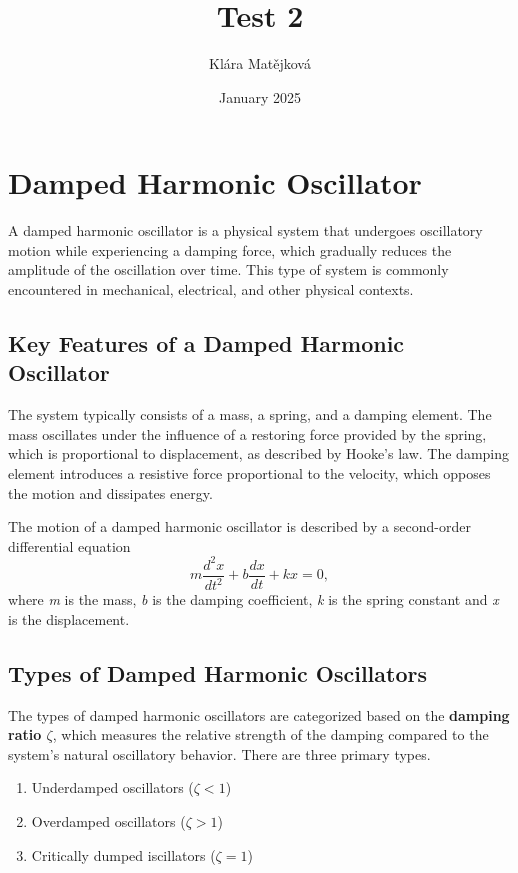 \documentclass{article}
\title{Test 2}
\author{Klára Matějková}
\date{January 2025}
\begin{document}
\maketitle

\section{Damped Harmonic Oscillator}
A damped harmonic oscillator is a physical system that undergoes oscillatory motion while experiencing a damping force, which gradually reduces the amplitude of the oscillation over time. This type of system is commonly encountered in mechanical, electrical, and other physical contexts.

\subsection{Key Features of a Damped Harmonic Oscillator}
The system typically consists of a mass, a spring, and a damping element. The mass oscillates under the influence of a restoring force provided by the spring, which is proportional to displacement, as described by Hooke's law. The damping element introduces a resistive force proportional to the velocity, which opposes the motion and dissipates energy.

The motion of a damped harmonic oscillator is described by a second-order differential equation
\begin{equation}
    m\frac{d^2x}{dt^2}+b\frac{dx}{dt}+kx=0,
\end{equation}
where \emph{m} is the mass, \emph{b} is the damping coefficient, \emph{k} is the spring constant and \emph{x} is the displacement.

\subsection{Types of Damped Harmonic Oscillators}
The types of damped harmonic oscillators are categorized based on the \textbf{damping ratio $\zeta$}, which measures the relative strength of the damping compared to the system's natural oscillatory behavior. There are three primary types.
\begin{enumerate}
    \item Underdamped oscillators ($\zeta<1$)
    \item Overdamped oscillators ($\zeta>1$)
    \item Critically dumped iscillators ($\zeta=1$)
\end{enumerate}
\end{document}
